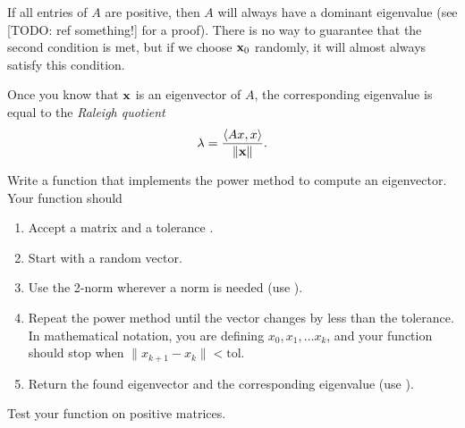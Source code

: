 If all entries of $A$ are positive, then $A$ will always have a dominant eigenvalue (see [TODO: ref something!] for a proof). 
There is no way to guarantee that the second condition is met, but if we choose ${\bf x}_0$ randomly, it will almost always satisfy this condition.

Once you know that ${\bf x}$ is an eigenvector of $A$, the corresponding eigenvalue is equal to the \emph{Raleigh quotient}
\[
\lambda = \frac{\langle Ax, x \rangle}{\|{\bf x}\|}.
\]



\begin{problem}
Write a function that implements the power method to compute an eigenvector. Your function should
\begin{enumerate}
\item Accept a matrix and a tolerance .
\item Start with a random vector.
\item Use the 2-norm wherever a norm is needed (use ).
\item Repeat the power method until the vector changes by less than the tolerance. In mathematical notation, you are defining $x_0, x_1, \ldots x_k$, and your function should stop when $\|x_{k+1}-x_k\| < \text{tol}$.
\item Return the found eigenvector and the corresponding eigenvalue (use ).
\end{enumerate} 
Test your function on positive matrices.
\end{problem}

